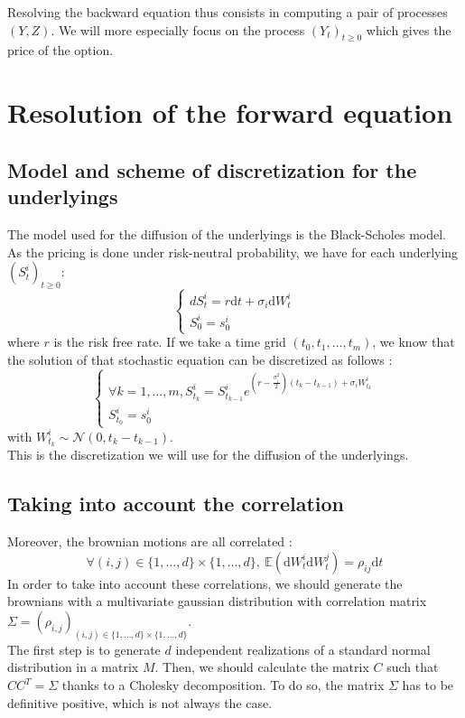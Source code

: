\documentclass[a4paper,11pt,english]{book}
\begin{document}
Resolving the backward equation thus consists in computing a pair of processes $(Y,Z)$. We will more especially focus on the process $(Y_{t})_{t\geq0}$ which gives the price of the option.

\section{Resolution of the forward equation}
\subsection{Model and scheme of discretization for the underlyings}
\label{subsec:underlying-discretization}
The model used for the diffusion of the underlyings is the Black-Scholes model. As the pricing is done under risk-neutral probability, we have for each underlying $(S^{i}_{t})_{t\geq0}$:
$$
\begin{cases}
dS_{t}^{i}=r\text{d}t+\sigma_{i}\text{d}W_{t}^{i} \\
S_{0}^{i}=s_{0}^{i} 
\end{cases}
$$
where $r$ is the risk free rate.
If we take a time grid $(t_{0},t_{1},\ldots,t_{m})$, we know that the solution of that stochastic equation can be discretized as follows :
$$\begin{cases}
\forall k=1,\ldots,m,  S_{t_{k}}^{i}=S_{t_{k-1}}^{i}e^{(r-\frac{\sigma_{i}^{2}}{2})(t_{k}-t_{k-1})+\sigma_{i}W_{t_{k}}^{i}}\\
S_{t_{0}}^{i}=s_{0}^{i} 
\end{cases}
$$
with $W_{t_{k}}^{i} \sim \mathcal{N}(0,t_{k}-t_{k-1})$.\\
This is the discretization we will use for the diffusion of the underlyings.
\subsection{Taking into account the correlation}
Moreover, the brownian motions are all correlated : $$\forall (i,j) \in \{1,\ldots,d\}\times\{1,\ldots,d\},~ \mathbb{E}(\text{d}W_{t}^{i}\text{d}W_{t}^{j})=\rho_{ij}\text{d}t$$
In order to take into account these correlations, we should generate the brownians with a multivariate gaussian distribution with correlation matrix $\Sigma=(\rho_{i,j})_{(i,j) \in \{1,\ldots,d\}\times\{1,\ldots,d\}}$.\\

The first step is to generate $d$ independent realizations of a standard normal distribution in a matrix $M$. Then, we should calculate the matrix $C$ such that $CC^{T}=\Sigma$ thanks to a Cholesky decomposition. To do so, the matrix $\Sigma$ has to be definitive positive, which is not always the case. \\
\end{document}
